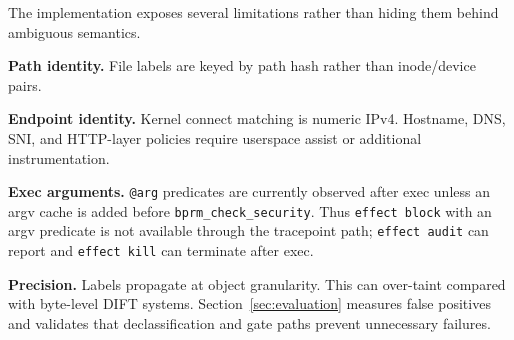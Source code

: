 The implementation exposes several limitations rather than hiding them behind
ambiguous semantics.

\textbf{Path identity.} File labels are keyed by path hash rather than
inode/device pairs.

\textbf{Endpoint identity.} Kernel connect matching is numeric IPv4. Hostname,
DNS, SNI, and HTTP-layer policies require userspace assist or additional
instrumentation.

\textbf{Exec arguments.} \texttt{@arg} predicates are currently observed after
exec unless an argv cache is added before \texttt{bprm\_check\_security}. Thus
\texttt{effect block} with an argv predicate is not available through the
tracepoint path; \texttt{effect audit} can report and \texttt{effect kill} can
terminate after exec.

\textbf{Precision.} Labels propagate at object granularity. This can over-taint
compared with byte-level DIFT systems. Section~\ref{sec:evaluation} measures
false positives and validates that declassification and gate paths prevent
unnecessary failures.
